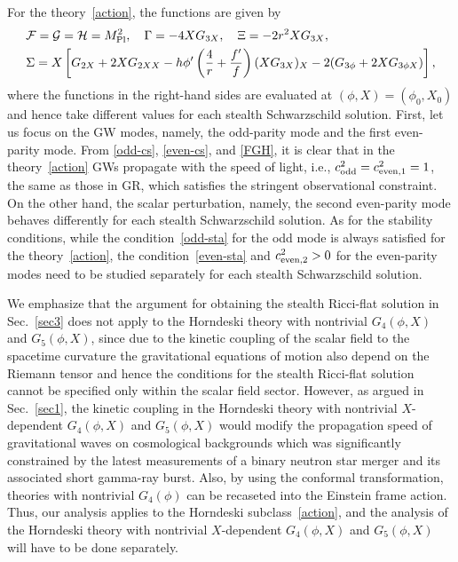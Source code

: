 \documentclass[prd,amsmath,amssymb,floatfix,superscriptaddress,notitlepage,nofootinbib,preprintnumbers]{revtex4-1}
\newcommand{\f}[2]{\frac{#1}{#2}}
\newcommand{\mk}[1]{\left( #1 \right)}
\newcommand{\kk}[1]{\left[ #1 \right]}
\newcommand{\F}{\mathcal{F}}
\newcommand{\G}{\mathcal{G}}
\renewcommand{\H}{\mathcal{H}}
\begin{document}
For the theory~\eqref{action}, the functions are given by 
\begin{align} \label{FGH}
&\F=\G=\H=M_{\rm Pl}^2,
\quad \Gamma=-4XG_{3X},\quad \Xi=-2r^2XG_{3X}, \notag\\
&\Sigma= X\kk{G_{2X}+2XG_{2XX} - h\phi' \mk{\f{4}{r}+\f{f'}{f}} (XG_{3X})_X - 2(G_{3\phi}+ 2XG_{3\phi X}) } ,
\end{align}
where the functions in the right-hand sides are evaluated at $(\phi,X)=(\phi_0,X_0)$ 
and hence take different values for each stealth Schwarzschild solution.
First, let us focus on the GW modes, namely, the odd-parity mode and the first even-parity mode.
From \eqref{odd-cs}, \eqref{even-cs}, and \eqref{FGH}, 
it is clear that in the theory~\eqref{action} 
GWs propagate with the speed of light, 
i.e., $c^2_{\rm odd}=c^2_{{\rm even},1}=1$, the same as those in GR,
which satisfies the stringent observational constraint.
On the other hand, the scalar perturbation, namely,
the second even-parity mode
behaves differently for each stealth Schwarzschild solution.
As for the stability conditions, 
while the condition~\eqref{odd-sta} for the odd mode 
is always satisfied for the theory~\eqref{action}, 
the condition~\eqref{even-sta} and $c^2_{{\rm even},2}>0$ for the even-parity modes  
need to be studied separately for each stealth Schwarzschild solution.



We emphasize 
that 
the argument for obtaining the stealth Ricci-flat solution
in Sec.~\ref{sec3}
does not apply 
to the Horndeski theory with 
nontrivial $G_4(\phi,X)$ and $G_5(\phi,X)$,
since 
due to the kinetic coupling of the scalar field
to the spacetime curvature
the gravitational equations of motion
also  
depend on the Riemann tensor
and hence 
the conditions for the stealth Ricci-flat solution
cannot be specified only within the scalar field sector.
However,
as argued in Sec.~\ref{sec1},
the kinetic coupling in
the Horndeski theory 
with nontrivial $X$-dependent $G_4(\phi,X)$ and $G_5(\phi,X)$
would modify the propagation speed of gravitational waves
on cosmological backgrounds
which was significantly constrained by the latest measurements 
of a binary neutron star merger
and its associated short gamma-ray burst.
Also, by using the conformal transformation, theories with nontrivial $G_4(\phi)$ can be recaseted into the Einstein frame action.  
Thus, our analysis applies to the Horndeski subclass~\eqref{action}, and
the analysis of the Horndeski theory 
with nontrivial $X$-dependent $G_4(\phi,X)$ and $G_5(\phi,X)$
will have to be done separately.
\end{document}
